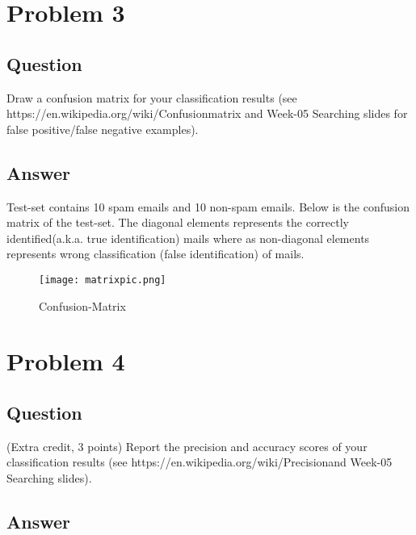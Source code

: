 \documentclass[letterpaper,12pt]{article}
\begin{document}


\newline
\section{Problem 3}

\subsection{Question}
\vspace*{10pt}
Draw a confusion matrix for your classification results (see https://en.wikipedia.org/wiki/Confusionmatrix and Week-05 Searching slides for false positive/false negative examples).

\subsection{Answer}
\vspace{2mm}

Test-set contains 10 spam emails and 10 non-spam emails. Below is the confusion matrix of the test-set. The diagonal elements represents the correctly identified(a.k.a. true identification) mails where as non-diagonal elements represents wrong classification (false identification) of mails.

\begin{figure}
\texttt{[image: matrixpic.png]}
\caption{Confusion-Matrix}
\end{figure}

\vspace{2mm}
\vspace*{5pt}
\section{Problem 4}

\subsection{Question}
\vspace*{10pt}
  (Extra credit, 3 points) Report the precision and accuracy scores of your classification results (see https://en.wikipedia.org/wiki/Precisionand Week-05 Searching slides).

\subsection{Answer}
\vspace{2mm}
\end{document}
